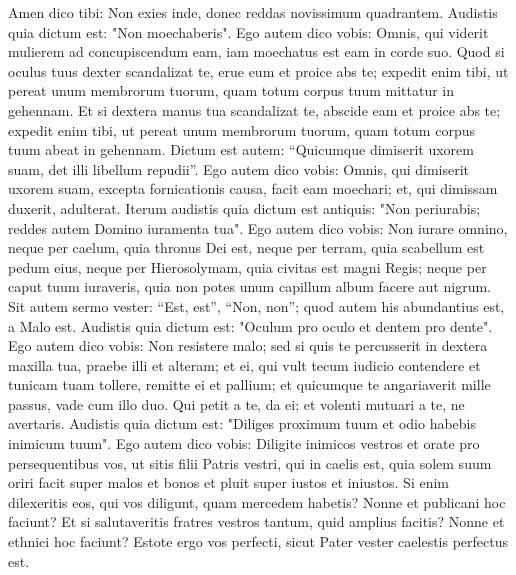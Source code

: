 \begin{biblechapter}
\verse Amen dico tibi: Non exies inde, donec reddas novissimum quadrantem. 
\verse Audistis quia dictum est: "Non moechaberis". 
\verse Ego autem dico vobis: Omnis, qui viderit mulierem ad concupiscendum eam, iam moechatus est eam in corde suo. 
\verse Quod si oculus tuus dexter scandalizat te, erue eum et proice abs te; expedit enim tibi, ut pereat unum membrorum tuorum, quam totum corpus tuum mittatur in gehennam. 
\verse Et si dextera manus tua scandalizat te, abscide eam et proice abs te; expedit enim tibi, ut pereat unum membrorum tuorum, quam totum corpus tuum abeat in gehennam. 
\verse Dictum est autem: “Quicumque dimiserit uxorem suam, det illi libellum repudii”. 
\verse Ego autem dico vobis: Omnis, qui dimiserit uxorem suam, excepta fornicationis causa, facit eam moechari; et, qui dimissam duxerit, adulterat. 
\verse Iterum audistis quia dictum est antiquis: "Non periurabis; reddes autem Domino iuramenta tua". 
\verse Ego autem dico vobis: Non iurare omnino, neque per caelum, quia thronus Dei est, 
\verse neque per terram, quia scabellum est pedum eius, neque per Hierosolymam, quia civitas est magni Regis; 
\verse neque per caput tuum iuraveris, quia non potes unum capillum album facere aut nigrum.  
\verse Sit autem sermo vester: “Est, est”, “Non, non”; quod autem his abundantius est, a Malo est. 
\verse Audistis quia dictum est: "Oculum pro oculo et dentem pro dente". 
\verse Ego autem dico vobis: Non resistere malo; sed si quis te percusserit in dextera maxilla tua, praebe illi et alteram; 
\verse et ei, qui vult tecum iudicio contendere et tunicam tuam tollere, remitte ei et pallium; 
\verse et quicumque te angariaverit mille passus, vade cum illo duo. 
\verse Qui petit a te, da ei; et volenti mutuari a te, ne avertaris. 
\verse Audistis quia dictum est: "Diliges proximum tuum et odio habebis inimicum tuum". 
\verse Ego autem dico vobis: Diligite inimicos vestros et orate pro persequentibus vos, 
\verse ut sitis filii Patris vestri, qui in caelis est, quia solem suum oriri facit super malos et bonos et pluit super iustos et iniustos. 
\verse Si enim dilexeritis eos, qui vos diligunt, quam mercedem habetis? Nonne et publicani hoc faciunt? 
\verse Et si salutaveritis fratres vestros tantum, quid amplius facitis? Nonne et ethnici hoc faciunt? 
\verse Estote ergo vos perfecti, sicut Pater vester caelestis perfectus est. 
\end{biblechapter}

